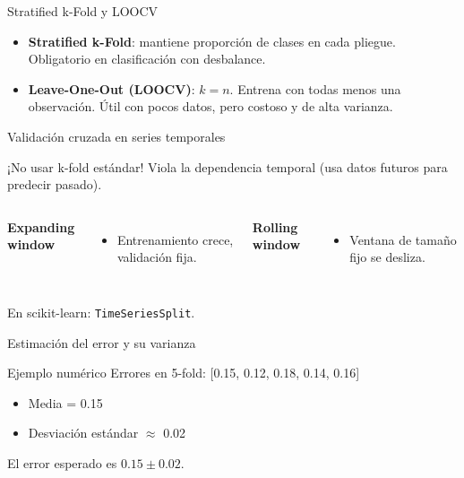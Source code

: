 \documentclass[aspectratio=169, 10pt, xcolor=table]{beamer}
\begin{document}
\begin{frame}{Stratified k-Fold y LOOCV}
    \begin{itemize}
        \item \textbf{Stratified k-Fold}: mantiene proporción de clases en cada pliegue. Obligatorio en clasificación con desbalance.
        \item \textbf{Leave-One-Out (LOOCV)}: $k=n$. Entrena con todas menos una observación. Útil con pocos datos, pero costoso y de alta varianza.
    \end{itemize}
\end{frame}

\begin{frame}{Validación cruzada en series temporales}
    \begin{alertblock}{¡No usar k-fold estándar!}
        Viola la dependencia temporal (usa datos futuros para predecir pasado).
    \end{alertblock}
    \begin{columns}[t]
        \textbf{Expanding window}
        \begin{itemize}
            \item Entrenamiento crece, validación fija.
        \end{itemize}
        \textbf{Rolling window}
        \begin{itemize}
            \item Ventana de tamaño fijo se desliza.
        \end{itemize}
    \end{columns}
    \vspace{0.3cm}
    En scikit-learn: \texttt{TimeSeriesSplit}.
\end{frame}

\begin{frame}{Estimación del error y su varianza}
    \begin{exampleblock}{Ejemplo numérico}
        Errores en 5-fold: [0.15, 0.12, 0.18, 0.14, 0.16]
        \begin{itemize}
            \item Media = 0.15
            \item Desviación estándar $\approx$ 0.02
        \end{itemize}
        El error esperado es $0.15 \pm 0.02$.
    \end{exampleblock}
\end{frame}
\end{document}
